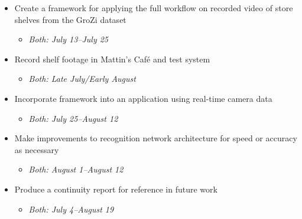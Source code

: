 \documentclass{article}
\begin{document}
\begin{itemize}
	\item Create a framework for applying the full workflow on recorded video of store shelves from the GroZi dataset
	\begin{itemize}
		\item \textit{Both: July 13--July 25}
	\end{itemize}

	\item Record shelf footage in Mattin's Café and test system
	\begin{itemize}
		\item \textit{Both: Late July/Early August}
	\end{itemize}

	\item Incorporate framework into an application using real-time camera data
	\begin{itemize}
		\item \textit{Both: July 25--August 12}
	\end{itemize}

	\item Make improvements to recognition network architecture for speed or accuracy as necessary
	\begin{itemize}
		\item \textit{Both: August 1--August 12}
	\end{itemize}

	\item Produce a continuity report for reference in future work
	\begin{itemize}
		\item \textit{Both: July 4--August 19}
	\end{itemize}

\end{itemize}



\end{document}
